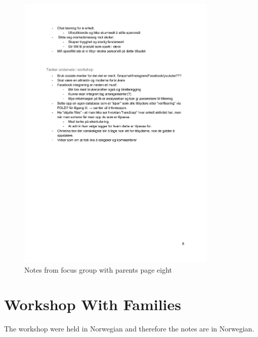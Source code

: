 \begin{figure}[H]
\centering
    \includegraphics[width=0.85\textwidth]{fig/workshop/providers/WSTilbydere_8.pdf}
    \caption{Notes from focus group with parents page eight}
    \label{Provider_8}
\end{figure}

\section{Workshop With Families}
\label{workshop_with_families}
The workshop were held in Norwegian and therefore the notes are in Norwegian.

